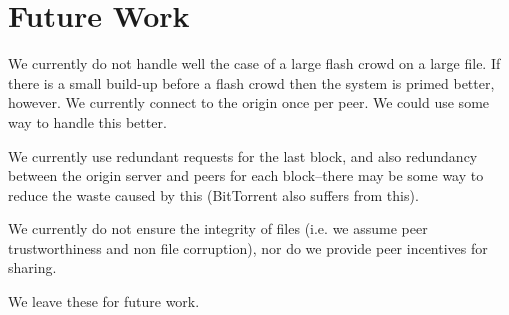 \section{Future Work}
We currently do not handle well the case of a large flash crowd on a large file. If there is a small build-up
before a flash crowd then the system is primed better, however. We currently connect to the origin
once per peer. We could use some way to handle this better.


We currently use redundant requests for the last block, and also redundancy between
the origin server and peers for each block--there may be some way to reduce the waste caused by this
(BitTorrent also suffers from this).

We currently do not ensure the integrity of files (i.e. we assume peer trustworthiness and non file
corruption), nor do we provide peer incentives for sharing.

We leave these for future work.